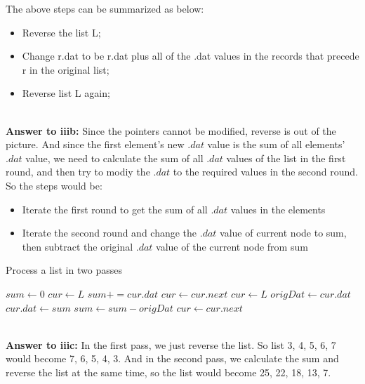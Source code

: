 \documentclass[a4paper,11pt]{article}
\theoremstyle{mytheor}
\begin{document}
The above steps can be summarized as below:
\begin{itemize}
    \item Reverse the list L;
    \item Change r.dat to be r.dat plus all of the .dat values in the records that precede r in the original list;
    \item Reverse list L again;
\end{itemize}

\vspace{1.2in}
~\\

\noindent\textbf{Answer to iiib:}
Since the pointers cannot be modified, reverse is out of the picture. And since the first element's new $.dat$ value is the sum of all elements' $.dat$ value, we need to calculate the sum of all $.dat$ values of the list in the first round, and then try to modiy the $.dat$ to the required values in the second round.
So the steps would be:
\begin{itemize}
    \item Iterate the first round to get the sum of all $.dat$ values in the elements
    \item Iterate the second round and change the $.dat$ value of current node to sum, then subtract the original $.dat$ value of the current node from sum
\end{itemize}

\begin{algorithm}[H]
\caption{Process a list in two passes}
\begin{algorithmic}[1]
  \State $sum \gets 0$
  \State $cur \gets L$
    \State $sum += cur.dat$
    \State $cur \gets cur.next$
  \EndWhile
  \State $cur \gets L$
    \State $origDat \gets cur.dat$
    \State $cur.dat \gets sum$
    \State $sum \gets sum - origDat$
    \State $cur \gets cur.next$
  \EndWhile
\EndProcedure
\end{algorithmic}
\end{algorithm}

\vspace{1.2in}
~\\

\noindent\textbf{Answer to iiic:} In the first pass, we just reverse the list. So list 3, 4, 5, 6, 7 would become 7, 6, 5, 4, 3. And in the second pass, we calculate the sum and reverse the list at the same time, so the list would become 25, 22, 18, 13, 7.
\end{document}
